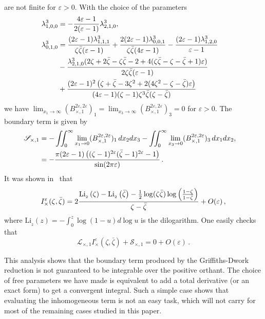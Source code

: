 \documentclass[a4paper,12pt]{article}
\numberwithin{equation}{section}
\numberwithin{figure}{section}
\def\Li#1(#2){\textrm{Li}_{#1}\left(#2\right)}
\begin{document}
are not finite for $\varepsilon>0$.
With the choice of the parameters 
\begin{align}
 \lambda^3_{1,0,0}&= -\frac{4 \varepsilon -1 }{2 (\varepsilon
                       -1)} \lambda^3_{2,1,0},\cr
                       \lambda^3_{0,1,0}&=\frac{(2 \varepsilon -1) \lambda^3_{1,1,1}}{\zeta  \bar\zeta (\varepsilon
   -1)}+\frac{2 (2 \varepsilon -1) \lambda^3_{0,0,1}}{\zeta  \bar\zeta (4 \varepsilon
                                          -1)}-\frac{(2 \varepsilon -1)
   \lambda^3_{1,2,0}}{\varepsilon -1}\cr
                                          &-\frac{\lambda^3_{2,1,0} (2 \zeta +2 \bar\zeta-\zeta  \bar\zeta -2+4( \zeta  \bar\zeta - \zeta  - \bar\zeta 
                                            +1 )\varepsilon)}{2 \zeta  \bar\zeta (\varepsilon -1)}\cr
                                            &+\frac{(2 \varepsilon -1)^2 \left(\zeta
   +\bar\zeta -3 \zeta ^2+2 (4\zeta ^2  - \zeta   - \bar\zeta) \varepsilon
   \right)}{ (4 \varepsilon -1)(\zeta -1) \zeta ^3 \bar\zeta (\zeta -\bar\zeta)}
\end{align}
we have
$\lim_{x_1\to\infty}(B^{2\varepsilon,2\varepsilon}_{\times,1})_1=\lim_{x_3\to\infty}(B^{2\varepsilon,2\varepsilon}_{\times,1})_3=0$
for $\varepsilon>0$.  The boundary term is given by
  \begin{align}
    \mathscr{S}_{\times,1}&=-\iint_0^\infty
\lim_{x_1\to0}
  (B^{2\varepsilon,2\varepsilon}_{\times,1})_1\,dx_2dx_3
-\iint_0^\infty
\lim_{x_3\to0}
                            (B^{2\varepsilon,2\varepsilon}_{\times,1})_3\,dx_1dx_2,\cr
                            &=-\frac{\pi  (2 \varepsilon -1) \left((\zeta -1)^{2 \varepsilon }
   (\bar\zeta-1)^{2 \varepsilon }-1\right)}{ \sin (2 \pi  \varepsilon ) }\,.
\end{align}  
%
It was shown in~\cite{Heckelbacher:2022fbx} that
\begin{equation}
   I^\varepsilon_\times(\zeta,\bar\zeta)=
   2{\Li_2(\zeta)-\Li_2(\bar\zeta)-\frac12\log(\zeta\bar\zeta)\log\left(1-\zeta\over
    1-\bar\zeta \right) \over \zeta-\bar\zeta}+O(\varepsilon)\,,
\end{equation}
where $\Li_2(z)=-\int_0^z \log(1-u)d\log u$ is the dilogarithm.
One easily checks that
\begin{equation}
  \mathscr{L}_{\times,1}     I^\varepsilon_\times(\zeta,\bar\zeta)+ \mathscr{S}_{\times,1} =0+O(\varepsilon)\,.
\end{equation}


This analysis shows that the boundary term produced by the
Griffiths-Dwork reduction is not guaranteed to be integrable over the
positive orthant. The choice of free parameters we have made is
equivalent to add a total derivative (or an exact form) to get a
convergent integral.
Such a simple case shows that evaluating the
inhomogeneous term is not an easy task, which will not carry for most
of the remaining cases studied in this paper. 
\end{document}
